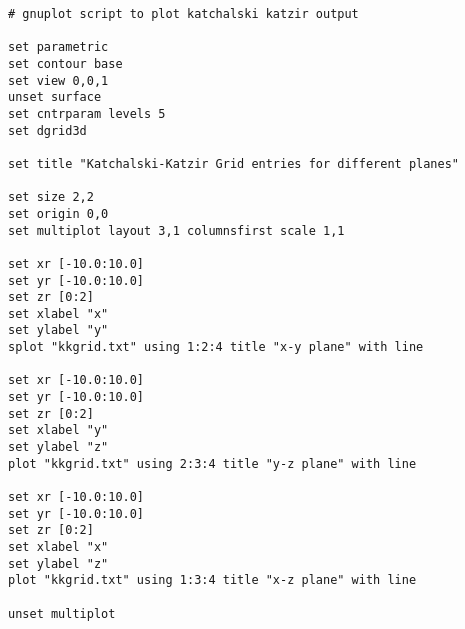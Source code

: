 \documentclass[11pt]{article}
\begin{document}
\begin{lstlisting}
# gnuplot script to plot katchalski katzir output

set parametric 
set contour base 
set view 0,0,1
unset surface
set cntrparam levels 5
set dgrid3d

set title "Katchalski-Katzir Grid entries for different planes"

set size 2,2
set origin 0,0
set multiplot layout 3,1 columnsfirst scale 1,1

set xr [-10.0:10.0]
set yr [-10.0:10.0]
set zr [0:2]
set xlabel "x"
set ylabel "y"
splot "kkgrid.txt" using 1:2:4 title "x-y plane" with line

set xr [-10.0:10.0]
set yr [-10.0:10.0]
set zr [0:2]
set xlabel "y"
set ylabel "z"
plot "kkgrid.txt" using 2:3:4 title "y-z plane" with line

set xr [-10.0:10.0]
set yr [-10.0:10.0]
set zr [0:2]
set xlabel "x"
set ylabel "z"
plot "kkgrid.txt" using 1:3:4 title "x-z plane" with line

unset multiplot
\end{lstlisting}
\end{document}
